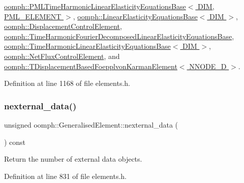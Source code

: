 \hyperlink{classoomph_1_1PMLTimeHarmonicLinearElasticityEquationsBase_a5d0b3ed720b44499cf9e174c8d46b040}{oomph\+::\+P\+M\+L\+Time\+Harmonic\+Linear\+Elasticity\+Equations\+Base$<$ D\+I\+M, P\+M\+L\+\_\+\+E\+L\+E\+M\+E\+N\+T $>$}, \hyperlink{classoomph_1_1LinearElasticityEquationsBase_adf786bf2d8fe20b864d7f2bf90b20242}{oomph\+::\+Linear\+Elasticity\+Equations\+Base$<$ D\+I\+M $>$}, \hyperlink{classoomph_1_1DisplacementControlElement_aceec0d8fd80fc5d50451e99680306d1a}{oomph\+::\+Displacement\+Control\+Element}, \hyperlink{classoomph_1_1TimeHarmonicFourierDecomposedLinearElasticityEquationsBase_a7fc55ec08c580274e0f0de664c43c249}{oomph\+::\+Time\+Harmonic\+Fourier\+Decomposed\+Linear\+Elasticity\+Equations\+Base}, \hyperlink{classoomph_1_1TimeHarmonicLinearElasticityEquationsBase_a8008c586eb05403bef38a8d2fe421417}{oomph\+::\+Time\+Harmonic\+Linear\+Elasticity\+Equations\+Base$<$ D\+I\+M $>$}, \hyperlink{classoomph_1_1NetFluxControlElement_a16809a8ad123ba41f826d9e920aba9e0}{oomph\+::\+Net\+Flux\+Control\+Element}, and \hyperlink{classoomph_1_1TDisplacementBasedFoepplvonKarmanElement_a860284d46ca7b85c519464ec2a6666ec}{oomph\+::\+T\+Displacement\+Based\+Foepplvon\+Karman\+Element$<$ N\+N\+O\+D\+E\+\_\+D $>$}.



Definition at line 1168 of file elements.\+h.

\mbox{\label{classoomph_1_1GeneralisedElement_a01ff34b3ace7455df74ad77fc86beb71}} 
\subsubsection{\texorpdfstring{nexternal\+\_\+data()}{nexternal\_data()}}
{\footnotesize\ttfamily unsigned oomph\+::\+Generalised\+Element\+::nexternal\+\_\+data (\begin{DoxyParamCaption}{ }\end{DoxyParamCaption}) const\hspace{0.3cm}{\ttfamily [inline]}}



Return the number of external data objects. 



Definition at line 831 of file elements.\+h.



